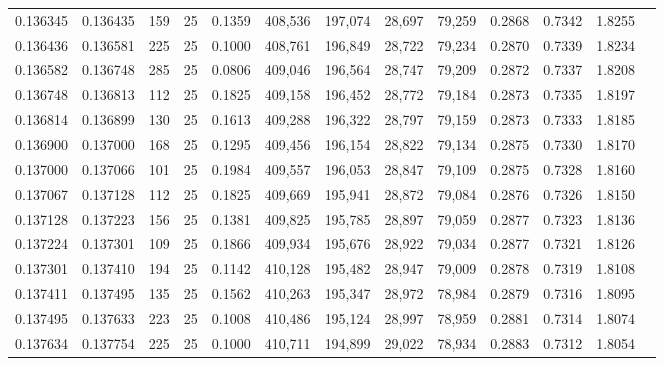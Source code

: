 \begin{tabular}{rrrrrrrrrrrrr}
0.136345 & 0.136435 &   159 &  25 &                                     0.1359 & 408,536 & 197,074 &  28,697 &  79,259 & 0.2868 & 0.7342 & 1.8255 \\
0.136436 & 0.136581 &   225 &  25 &                                     0.1000 & 408,761 & 196,849 &  28,722 &  79,234 & 0.2870 & 0.7339 & 1.8234 \\
0.136582 & 0.136748 &   285 &  25 &                                     0.0806 & 409,046 & 196,564 &  28,747 &  79,209 & 0.2872 & 0.7337 & 1.8208 \\
0.136748 & 0.136813 &   112 &  25 &                                     0.1825 & 409,158 & 196,452 &  28,772 &  79,184 & 0.2873 & 0.7335 & 1.8197 \\
0.136814 & 0.136899 &   130 &  25 &                                     0.1613 & 409,288 & 196,322 &  28,797 &  79,159 & 0.2873 & 0.7333 & 1.8185 \\
0.136900 & 0.137000 &   168 &  25 &                                     0.1295 & 409,456 & 196,154 &  28,822 &  79,134 & 0.2875 & 0.7330 & 1.8170 \\
0.137000 & 0.137066 &   101 &  25 &                                     0.1984 & 409,557 & 196,053 &  28,847 &  79,109 & 0.2875 & 0.7328 & 1.8160 \\
0.137067 & 0.137128 &   112 &  25 &                                     0.1825 & 409,669 & 195,941 &  28,872 &  79,084 & 0.2876 & 0.7326 & 1.8150 \\
0.137128 & 0.137223 &   156 &  25 &                                     0.1381 & 409,825 & 195,785 &  28,897 &  79,059 & 0.2877 & 0.7323 & 1.8136 \\
0.137224 & 0.137301 &   109 &  25 &                                     0.1866 & 409,934 & 195,676 &  28,922 &  79,034 & 0.2877 & 0.7321 & 1.8126 \\
0.137301 & 0.137410 &   194 &  25 &                                     0.1142 & 410,128 & 195,482 &  28,947 &  79,009 & 0.2878 & 0.7319 & 1.8108 \\
0.137411 & 0.137495 &   135 &  25 &                                     0.1562 & 410,263 & 195,347 &  28,972 &  78,984 & 0.2879 & 0.7316 & 1.8095 \\
0.137495 & 0.137633 &   223 &  25 &                                     0.1008 & 410,486 & 195,124 &  28,997 &  78,959 & 0.2881 & 0.7314 & 1.8074 \\
0.137634 & 0.137754 &   225 &  25 &                                     0.1000 & 410,711 & 194,899 &  29,022 &  78,934 & 0.2883 & 0.7312 & 1.8054 \\

\end{tabular}
